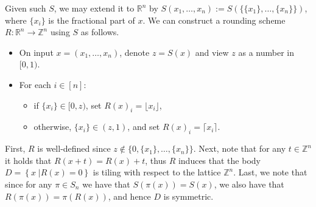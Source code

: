 \documentclass[10pt,a4paper]{article}
\newcommand\sett[2]{\left\{ \left. #1 \;\right\vert #2 \right\}}
\newcommand{\ZZ}{\mathbb{Z}}
\newcommand{\RR}{\mathbb{R}}
\begin{document}
Given such $S$, we may extend it to $\mathbb{R}^n$ by
$S(x_1,\ldots,x_n):=S(\{\{x_1\},\ldots,\{x_n\}\})$, where $\{x_i\}$ is the fractional part of $x$.
We can construct a rounding scheme
$R\colon \RR^n\to \ZZ^n$ using $S$ as follows.
\begin{itemize}
	\item
	On input $x=(x_1,\ldots,x_n)$, denote $z=S(x)$ and view
	$z$ as a number in $[0,1)$.
	\item For each $i\in [n]$:
\begin{itemize}
    \item
	if $\{x_i\}\in [0,z)$, set $R(x)_i = \lfloor x_i \rfloor$,
    \item otherwise, $\{x_i\}\in (z,1)$, and set $R(x)_i = \lceil x_i \rceil$.
\end{itemize}
\end{itemize}
First, $R$ is well-defined since $z\notin \{0,\{x_1\},\ldots,\{x_n\}\}$.
Next, note that for any $t\in\ZZ^n$ it holds that $R(x+t)=R(x)+t$, thus $R$ induces
that the body $D = \sett{x}{R(x) = 0}$ is tiling with respect to the lattice $\ZZ^n$.
Last, we note that since for any $\pi\in S_n$ we have that $S(\pi(x))=S(x)$, we also have
that $R(\pi(x))=\pi(R(x))$, and hence $D$ is symmetric.
\end{document}
